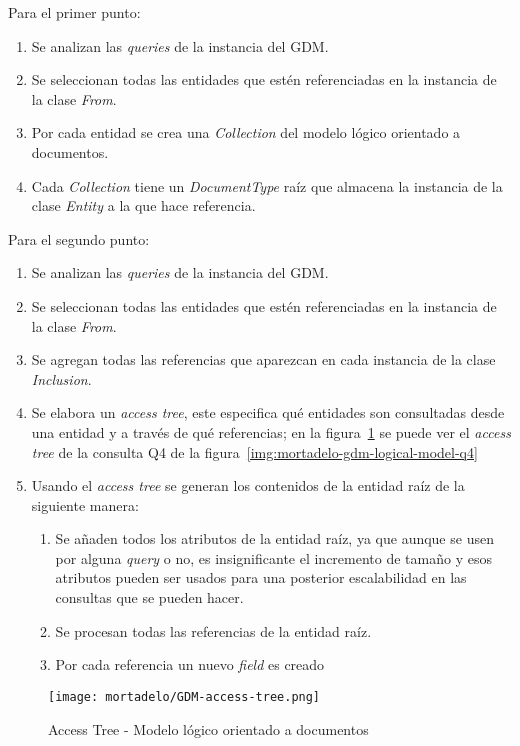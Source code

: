 Para el primer punto:
\begin{enumerate}
    \item Se analizan las \textit{queries} de la instancia del GDM.
    \item Se seleccionan todas las entidades que estén referenciadas en la instancia de la clase \textit{From}.
    \item Por cada entidad se crea una \textit{Collection} del modelo lógico orientado a documentos.
    \item Cada \textit{Collection} tiene un \textit{DocumentType} raíz que almacena la instancia de la clase \textit{Entity} a la que hace referencia.
\end{enumerate}

Para el segundo punto:
\begin{enumerate}
    \item Se analizan las \textit{queries} de la instancia del GDM.
    \item Se seleccionan todas las entidades que estén referenciadas en la instancia de la clase \textit{From}.
    \item Se agregan todas las referencias que aparezcan en cada instancia de la clase \textit{Inclusion}.
    \item Se elabora un \textit{access tree}, este especifica qué entidades son consultadas desde una entidad y a través de qué referencias; en la figura~\ref{img:mortadelo-gdm-logical-model-access-tree} se puede ver el \textit{access tree} de la consulta Q4 de la figura~\ref{img:mortadelo-gdm-logical-model-q4}
    \item Usando el \textit{access tree} se generan los contenidos de la entidad raíz de la siguiente manera:
    \begin{enumerate}
        \item Se añaden todos los atributos de la entidad raíz, ya que aunque se usen por alguna \textit{query} o no, es insignificante el incremento de tamaño y esos atributos pueden ser usados para una posterior escalabilidad en las consultas que se pueden hacer.
        \item Se procesan todas las referencias de la entidad raíz.
        \item Por cada referencia un nuevo \textit{field} es creado
    \end{enumerate}
\end{enumerate}

\begin{figure}[h!t] 
    \centering
    \texttt{[image: mortadelo/GDM-access-tree.png]}
    \caption{Access Tree - Modelo lógico orientado a documentos}
    \label{img:mortadelo-gdm-logical-model-access-tree}
\end{figure}

